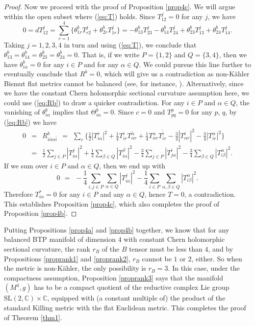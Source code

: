 \documentclass{amsart}
\begin{document}
\begin{proof}
Now we proceed with the proof of Proposition \ref{prop4c}. We will argue within the open subset where (\ref{eq:T}) holds. Since $T^j_{12}=0$ for any $j$, we have
$$ 0 = d T^j_{12} = \sum_{r=1}^4 \big\{ \theta^b_{1r} T^j_{r2} + \theta^b_{2r} T^j_{1r} \big\} = -\theta^b_{13} T^j_{23} -\theta^b_{14} T^j_{24} + \theta^b_{23} T^j_{13} +\theta^b_{24} T^j_{14}.$$
Taking $j=1,2,3,4$ in turn and using (\ref{eq:T}), we conclude that $\theta^b_{13}=\theta^b_{14}=\theta^b_{23}=\theta^b_{24}=0$. That is, if we write $P=\{ 1,2\}$ and $Q=\{3,4\}$, then we have $\theta^b_{i\alpha}=0$ for any $i\in P$ and for any $\alpha \in Q$. We could pursue this line further to eventually conclude that $R^b=0$, which will give us a contradiction as non-K\"ahler Bismut flat metrics cannot be balanced (see, for instance, \cite{WYZ}). Alternatively, since we have the constant Chern holomorphic sectional curvature assumption here, we could use (\ref{eq:Rb}) to draw a quicker contradiction. For any $i\in P$ and $\alpha \in Q$, the vanishing of $\theta^b_{i\alpha}$ implies that $\Theta^b_{i\alpha}=0$. Since $c=0$ and $T^p_{pq}=0$ for any $p$, $q$, by (\ref{eq:Rb}) we have
\begin{eqnarray*}
 0& = &  R^b_{i\bar{\alpha}\alpha \bar{i}} \ \ = \ \ \sum_r \big\{ \frac{1}{2} |T^r_{i\alpha}|^2 +\frac{1}{4}T^i_{ir} \overline{T^{\alpha}_{\alpha r} } +\frac{1}{4} T^{\alpha}_{\alpha r} \overline{ T^i_{ir}}  -\frac{3}{4} |T^i_{\alpha r}|^2 -  \frac{3}{4} |T^{\alpha}_{ir}|^2   \big\} \\
 & = & \frac{1}{2} \sum_{j\in P} |T^j_{i\alpha}|^2 + \frac{1}{2} \sum_{\beta \in Q} |T^{\beta}_{i\alpha}|^2 - \frac{3}{4}\sum_{j\in P} |T^i_{j \alpha }|^2 - \frac{3}{4} \sum_{\beta \in Q} |T^{\alpha}_{i\beta }|^2.
 \end{eqnarray*}
If we sum over $i\in P$ and $\alpha\in Q$, then we end up with
$$ 0 \ \, = \ \,-\frac{1}{4} \sum_{i,j\in P} \sum_{\alpha \in Q} |T^j_{i\alpha}|^2 -\frac{1}{4} \sum_{i\in P} \sum_{\alpha ,\beta \in Q} |T^{\alpha}_{i\beta }|^2. $$
Therefore $T^{\ast}_{i\alpha}=0$ for any $i\in P$ and any $\alpha \in Q$, hence $T=0$, a contradiction. This establishes Proposition \ref{prop4c}, which also completes the proof of Proposition \ref{prop4b}.
\end{proof}

Putting Propositions \ref{prop4a} and \ref{prop4b} together, we know that for any balanced BTP manifold of dimension $4$ with constant Chern holomorphic sectional curvature, the rank $r_B$ of the $B$ tensor must be less than $4$, and by Propositions \ref{proprank1} and \ref{proprank2}, $r_B$ cannot be $1$ or $2$, either. So when the metric is non-K\"ahler, the only possibility is $r_B=3$. In this case, under the compactness assumption, Proposition \ref{proprank3} says that the manifold $(M^4,g)$ has to be a compact quotient of the reductive complex Lie group $\mbox{SL}(2,{\mathbb C})\times {\mathbb C}$, equipped with (a constant multiple of) the product of the standard Killing metric with the flat Euclidean metric. This completes the proof of Theorem \ref{thm1}.
\end{document}
